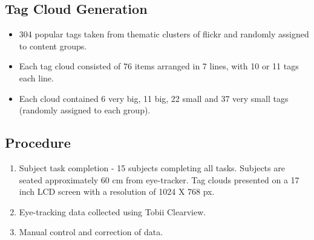 \subsection{Tag Cloud Generation}
\begin{itemize}
	\item 304 popular tags taken from thematic clusters of flickr and randomly assigned to content groups. 
	\item Each tag cloud consisted of 76 items arranged in 7 lines, with 10 or 11 tags each line.
	\item Each cloud contained 6 very big, 11 big, 22 small and 37 very small tags (randomly assigned to each group).
\end{itemize}

\subsection{Procedure}
\begin{enumerate}
	\item Subject task completion - 15 subjects completing all tasks. Subjects are seated approximately 60 cm from eye-tracker. Tag clouds presented on a 17 inch LCD screen with a resolution of 1024 X 768 px.
	\item Eye-tracking data collected using Tobii Clearview.
	\item Manual control and correction of data.
\end{enumerate}




